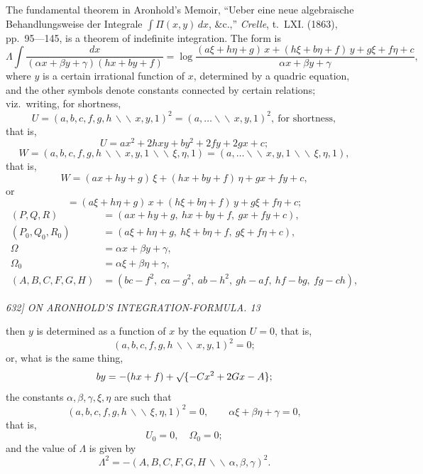 \documentclass[12pt,a4paper]{article}
\begin{document}
The fundamental theorem in Aronhold's Memoir, ``Ueber eine neue algebraische Behandlungsweise der Integrale $\int \Pi(x, y)\, dx$, \&c.,'' \textit{Crelle}, t.~LXI. (1863), pp.~95---145, is a theorem of indefinite integration. The form is
\[
\Lambda \int \frac{dx}{(\alpha x + \beta y + \gamma)(h x + b y + f)} = \log \frac{(a \xi + h \eta + g)\, x + (h \xi + b \eta + f)\, y + g \xi + f \eta + c}{\alpha x + \beta y + \gamma},
\]
where $y$ is a certain irrational function of $x$, determined by a quadric equation, and the other symbols denote constants connected by certain relations; viz.\ writing, for shortness,
\[
U = (a, b, c, f, g, h\,\backslash\!\backslash\, x, y, 1)^2 = (a, \ldots\backslash\!\backslash\, x, y, 1)^2,\ \text{for shortness},
\]
that is,
\[
U = a x^2 + 2 h x y + b y^2 + 2 f y + 2 g x + c;
\]
\[
W = (a, b, c, f, g, h\,\backslash\!\backslash\, x, y, 1\,\backslash\!\backslash\, \xi, \eta, 1) = (a, \ldots\backslash\!\backslash\, x, y, 1\,\backslash\!\backslash\, \xi, \eta, 1),
\]
that is,
\[
W = (a x + h y + g)\, \xi + (h x + b y + f)\, \eta + g x + f y + c,
\]
or
\[
= (a \xi + h \eta + g)\, x + (h \xi + b \eta + f)\, y + g \xi + f \eta + c;
\]
\begin{align*}
(P, Q, R) &= (a x + h y + g,\ h x + b y + f,\ g x + f y + c), \\
(P_0, Q_0, R_0) &= (a \xi + h \eta + g,\ h \xi + b \eta + f,\ g \xi + f \eta + c), \\
\Omega &= \alpha x + \beta y + \gamma, \\
\Omega_0 &= \alpha \xi + \beta \eta + \gamma, \\
(A, B, C, F, G, H) &= (b c - f^2,\ c a - g^2,\ a b - h^2,\ g h - a f,\ h f - b g,\ f g - c h),
\end{align*}

\clearpage
\setcounter{page}{13}

\begin{center}
\textit{632] \hfill ON ARONHOLD'S INTEGRATION-FORMULA. \hfill 13}
\end{center}

\noindent then $y$ is determined as a function of $x$ by the equation $U = 0$, that is,
\[
(a, b, c, f, g, h\,\backslash\!\backslash\, x, y, 1)^2 = 0;
\]
or, what is the same thing,
\[
b y = -(h x + f) + \surd\{-C x^2 + 2 G x - A\};
\]
the constants $\alpha, \beta, \gamma, \xi, \eta$ are such that
\[
(a, b, c, f, g, h\,\backslash\!\backslash\, \xi, \eta, 1)^2 = 0, \qquad \alpha \xi + \beta \eta + \gamma = 0,
\]
that is,
\[
U_0 = 0, \quad \Omega_0 = 0;
\]
and the value of $\Lambda$ is given by
\[
\Lambda^2 = -(A, B, C, F, G, H\,\backslash\!\backslash\, \alpha, \beta, \gamma)^2.
\]
\end{document}
